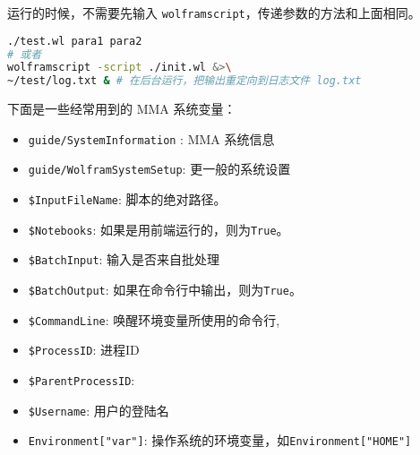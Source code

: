 运行的时候，不需要先输入 \verb`wolframscript`，传递参数的方法和上面相同。

\begin{lstlisting}[language=bash]
./test.wl para1 para2
# 或者
wolframscript -script ./init.wl &>\
~/test/log.txt & # 在后台运行，把输出重定向到日志文件 log.txt
\end{lstlisting}

下面是一些经常用到的 MMA 系统变量：

\begin{itemize}
\item \verb`guide/SystemInformation` : MMA 系统信息
\item \verb`guide/WolframSystemSetup`: 更一般的系统设置
\item \verb`$InputFileName`: 脚本的绝对路径。
\item \verb`$Notebooks`: 如果是用前端运行的，则为\verb`True`。
\item \verb`$BatchInput`: 输入是否来自批处理
\item \verb`$BatchOutput`: 如果在命令行中输出，则为\verb`True`。
\item \verb`$CommandLine`: 唤醒环境变量所使用的命令行,
\item \verb`$ProcessID`: 进程ID
\item \verb`$ParentProcessID`:
\item \verb`$Username`: 用户的登陆名
\item \verb`Environment["var"]`: 操作系统的环境变量，如\verb`Environment["HOME"]`
\end{itemize}
